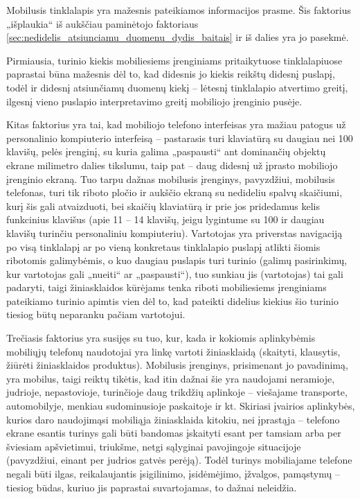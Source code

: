 \documentclass[kursinis-darbas]{vukf}
\begin{document}
Mobilusis tinklalapis yra mažesnis pateikiamos informacijos prasme. Šis faktorius „išplaukia“ iš aukščiau paminėtojo faktoriaus \ref{sec:nedidelis_atsiunciamu_duomenu_dydis_baitais} ir iš dalies yra jo pasekmė.

Pirmiausia, turinio kiekis mobiliesiems įrenginiams pritaikytuose tinklalapiuose paprastai būna mažesnis dėl to, kad didesnis jo kiekis reikštų didesnį puslapį, todėl ir didesnį atsiunčiamų duomenų kiekį – lėtesnį tinklalapio atvertimo greitį, ilgesnį vieno puslapio interpretavimo greitį mobiliojo įrenginio pusėje.

Kitas faktorius yra tai, kad mobiliojo telefono interfeisas yra mažiau patogus už personalinio kompiuterio interfeisą – pastarasis turi klaviatūrą su daugiau nei 100 klavišų, pelės įrenginį, su kuria galima „paspausti“ ant dominančių objektų ekrane milimetro dalies tikslumu, taip pat – daug didesnį už įprasto mobiliojo įrenginio ekraną. Tuo tarpu dažnas mobilusis įrenginys, pavyzdžiui, mobilusis telefonas, turi tik riboto pločio ir aukščio ekraną su nedideliu spalvų skaičiumi, kurį šis gali atvaizduoti, bei skaičių klaviatūrą ir prie jos pridedamus kelis funkcinius klavišus (apie 11 – 14 klavišų, jeigu lygintume su 100 ir daugiau klavišų turinčiu personaliniu kompiuteriu). Vartotojas yra priverstas navigaciją po visą tinklalapį ar po vieną konkretaus tinklalapio puslapį atlikti šiomis ribotomis galimybėmis, o kuo daugiau puslapis turi turinio (galimų pasirinkimų, kur vartotojas gali „nueiti“ ar „paspausti“), tuo sunkiau jis (vartotojas) tai gali padaryti, taigi žiniasklaidos kūrėjams tenka riboti mobiliesiems įrenginiams pateikiamo turinio apimtis vien dėl to, kad pateikti didelius kiekius šio turinio tiesiog būtų neparanku pačiam vartotojui.

Trečiasis faktorius yra susijęs su tuo, kur, kada ir kokiomis aplinkybėmis mobiliųjų telefonų naudotojai yra linkę vartoti žiniasklaidą (skaityti, klausytis, žiūrėti žiniasklaidos produktus). Mobilusis įrenginys, prisimenant jo pavadinimą, yra mobilus, taigi reiktų tikėtis, kad itin dažnai šie yra naudojami neramioje, judrioje, nepastovioje, turinčioje daug trikdžių aplinkoje – viešajame transporte, automobilyje, menkiau sudominusioje paskaitoje ir kt. Skiriasi įvairios aplinkybės, kurios daro naudojimąsi mobiliąja žiniasklaida kitokiu, nei įprastąja – telefono ekrane esantis turinys gali būti bandomas įskaityti esant per tamsiam arba per šviesiam apšvietimui, triukšme, netgi sąlyginai pavojingoje situacijoje (pavyzdžiui, einant per judrios gatvės perėją). Todėl turinys mobiliajame telefone negali būti ilgas, reikalaujantis įsigilinimo, įsidėmėjimo, įžvalgos, pamąstymų – tiesiog būdas, kuriuo jis paprastai suvartojamas, to dažnai neleidžia.
\end{document}
